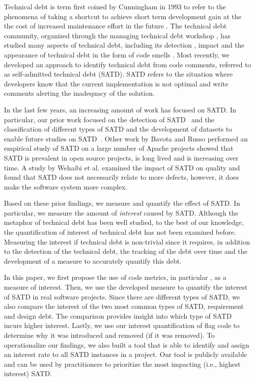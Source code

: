 Technical debt is term first coined by Cunningham in 1993 to refer to the phenomena of taking a shortcut to achieve short term development gain at the the cost of increased maintenance effort in the future \cite{Cunningham1992WPM}. The technical debt community, organized through the managing technical debt workshop \cite{Falessi2014MTD}, has studied many aspects of technical debt, including its detection \cite{Zazworka2013CSE}, impact \cite{Zazworka2011MTD}
and the appearance of technical debt in the form of code smells \cite{Fontana2012MTD}. Most recently, we developed an approach to identify technical debt from code comments, referred to as self-admitted technical debt (SATD). SATD refers to the situation where developers know that the current implementation is not optimal and write comments alerting the inadequacy of the solution.

In the last few years, an increasing amount of work has focused on SATD. In particular, our prior work focused on the detection of SATD~\cite{Potdar2014ICSME} and the classification of different types of SATD and the development of datasets to enable future studies on SATD~\cite{Maldonado2015MTD}. Other work by Bavota and Russo performed an empirical study of SATD on a large number of Apache projects showed that SATD is prevalent in open source projects, is long lived and is increasing over time. A study by Wehaibi et al.  examined the impact of SATD on quality and found that SATD does not necessarily relate to more defects, however, it does make the software system more complex. 

Based on these prior findings, we measure and quantify the effect of SATD. In particular, we measure the amount of \emph{interest} caused by SATD. Although the metaphor of technical debt has been well studied, to the best of our knowledge, the quantification of interest of technical debt has not been examined before. Measuring the interest if technical debt is non-trivial since it requires, in addition to the detection of the technical debt, the tracking of the debt over time and the development of a measure to accurately quantify this debt. 


In this paper, we first propose the use of code metrics, in particular , as a measure of interest. Then, we use the developed measure to quantify the interest of SATD in real software projects. Since there are different types of SATD, we also compare the interest of the two most common types of SATD, requirement and design debt. The comparison provides insight into which type of SATD incurs higher interest. Lastly, we use our interest quantification of flag  code to determine why it was introduced and removed (if it was removed). To operationalize our findings, we also built a tool that is able to identify and assign an interest rate to all SATD instances in a project. Our tool is publicly available and can be used by practitioners to prioritize the most impacting (i.e., highest interest) SATD.

